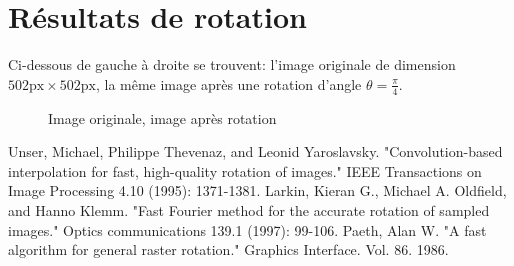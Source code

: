 \documentclass[12pt]{article}
\begin{document}
\section*{Résultats de rotation}
Ci-dessous de gauche à droite se trouvent: l'image originale de dimension $502\text{px} \times 502 \text{px}$, la même image après une rotation d'angle $\theta = \frac{\pi}{4}$.

\begin{figure}[h]
  \caption{Image originale, image après rotation}
\end{figure}

\begin{thebibliography}{2}

  Unser, Michael, Philippe Thevenaz, and Leonid Yaroslavsky. 
  "Convolution-based interpolation for fast, high-quality rotation of images." 
  IEEE Transactions on Image Processing 4.10 (1995): 1371-1381.
  Larkin, Kieran G., Michael A. Oldfield, and Hanno Klemm. 
  "Fast Fourier method for the accurate rotation of sampled images." 
  Optics communications 139.1 (1997): 99-106.
	Paeth, Alan W. 
	"A fast algorithm for general raster rotation." 
	Graphics Interface. Vol. 86. 1986.

\end{thebibliography}
\end{document}
